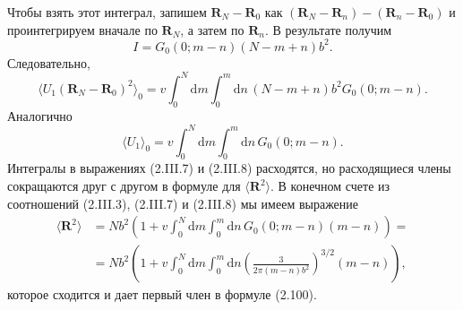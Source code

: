 \documentclass[12pt,a4paper]{article}
\begin{document}
Чтобы взять этот интеграл, запишем $\boldsymbol{R}_N - \boldsymbol{R}_0$ как $(\boldsymbol{R}_N - \boldsymbol{R}_n) - (\boldsymbol{R}_n - \boldsymbol{R}_0)$ и проинтегрируем вначале по $\boldsymbol{R}_N$, а затем по $\boldsymbol{R}_n$. В результате получим
\begin{equation}
I = G_0(0; m - n)(N - m + n)b^2. \tag{2.III.6}
\end{equation}
Следовательно,
\begin{equation}
\langle U_1(\boldsymbol{R}_N - \boldsymbol{R}_0)^2\rangle_0 = v\int_0^N\!\mathrm{d}m\int_0^m\!\mathrm{d}n\,(N - m + n)b^2 G_0(0; m - n). \tag{2.III.7}
\end{equation}
Аналогично
\begin{equation}
\langle U_1\rangle_0 = v\int_0^N\!\mathrm{d}m\int_0^m\!\mathrm{d}n\,G_0(0; m - n). \tag{2.III.8}
\end{equation}
Интегралы в выражениях (2.III.7) и (2.III.8) расходятся, но расходящиеся члены сокращаются друг с другом в формуле для $\langle\boldsymbol{R}^2\rangle$. В конечном счете из соотношений (2.III.3), (2.III.7) и (2.III.8) мы имеем выражение
\begin{align}
\langle\boldsymbol{R}^2\rangle &= Nb^2\left(1 + v\int_0^N\!\mathrm{d}m\int_0^m\!\mathrm{d}n\,G_0(0; m - n)(m - n)\right) = \nonumber\\
&= Nb^2\left(1 + v\int_0^N\!\mathrm{d}m\int_0^m\!\mathrm{d}n\left(\frac{3}{2\pi(m - n)b^2}\right)^{3/2}(m - n)\right), \tag{2.III.9}
\end{align}
которое сходится и дает первый член в формуле (2.100).
\end{document}
